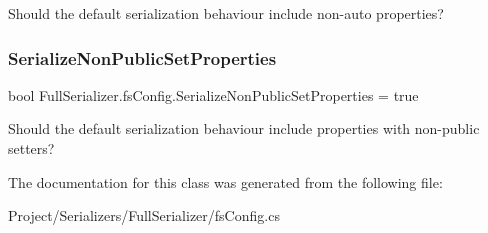 Should the default serialization behaviour include non-\/auto properties? 

\mbox{\label{class_full_serializer_1_1fs_config_a2ad13b04c4de865650427884b85b088d}} 
\subsubsection{\texorpdfstring{Serialize\+Non\+Public\+Set\+Properties}{SerializeNonPublicSetProperties}}
{\footnotesize\ttfamily bool Full\+Serializer.\+fs\+Config.\+Serialize\+Non\+Public\+Set\+Properties = true}



Should the default serialization behaviour include properties with non-\/public setters? 



The documentation for this class was generated from the following file\+:\begin{DoxyCompactItemize}
\item 
Project/\+Serializers/\+Full\+Serializer/fs\+Config.\+cs\end{DoxyCompactItemize}
